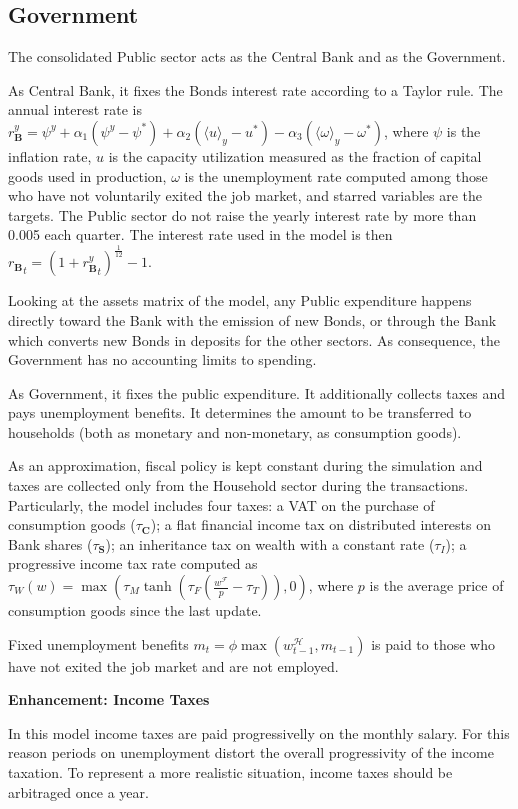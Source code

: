 \documentclass[a4paper, headings=standardclasses]{scrartcl}
\newenvironment{enh}[1][]{\begin{framed}\noindent\textbf{Enhancement: #1}\par}{\end{framed}}
\begin{document}
\subsection{Government}
The consolidated Public sector acts as the Central Bank and as the Government.

As Central Bank, it fixes the Bonds interest rate according to a Taylor rule.
The annual interest rate is ${r_\mathbf{B}^y} = \psi^y + \alpha_1 (\psi^y - \psi^*) + \alpha_2 (\langle u \rangle_y - u^*) - \alpha_3 (\langle \omega \rangle_y - \omega^*)$, where $\psi$ is the inflation rate, $u$ is the capacity utilization measured as the fraction of capital goods used in production, $\omega$ is the unemployment rate computed among those who have not voluntarily exited the job market, and starred variables are the targets. The Public sector do not raise the yearly interest rate by more than 0.005 each quarter. The interest rate used in the model is then ${r_\mathbf{B}}_t = (1 + {r_\mathbf{B}^y}_t)^{\frac{1}{12}} - 1$.

Looking at the assets matrix of the model, any Public expenditure happens directly toward the Bank with the emission of new Bonds, or through the Bank which converts new Bonds in deposits for the other sectors. As consequence, the Government has no accounting limits to spending.

As Government, it fixes the public expenditure. It additionally collects taxes and pays unemployment benefits. It determines the amount to be transferred to households (both as monetary and non-monetary, as consumption goods).

As an approximation, fiscal policy is kept constant during the simulation and taxes are collected only from the Household sector during the transactions. Particularly, the model includes four taxes: a VAT on the purchase of consumption goods ($\tau_\mathbf{C}$); a flat financial income tax on distributed interests on Bank shares ($\tau_\mathbf{S}$); an inheritance tax on wealth with a constant rate ($\tau_I$); a progressive income tax rate computed as $\tau_W(w) = \max(\tau_M \tanh(\tau_F (\frac{w^\mathcal{F}}{p} - \tau_T)),0)$, where $p$ is the average price of consumption goods since the last update. %

Fixed unemployment benefits $m_{t} = \phi \max(w^\mathcal{H}_{t-1}, m_{t-1})$ is paid to those who have not exited the job market and are not employed.

\begin{enh}[Income Taxes]
    In this model income taxes are paid progressivelly on the monthly salary. For this reason periods on unemployment distort the overall progressivity of the income taxation. To represent a more realistic situation, income taxes should be arbitraged once a year.
\end{enh}
\end{document}

